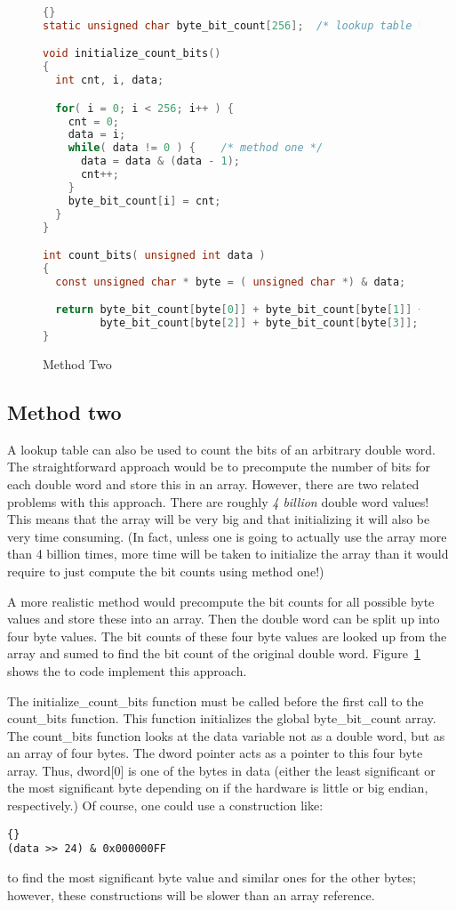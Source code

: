 \begin{figure}[t]
\begin{lstlisting}[frame=tlrb, language=C]{}
static unsigned char byte_bit_count[256];  /* lookup table */

void initialize_count_bits()
{
  int cnt, i, data;

  for( i = 0; i < 256; i++ ) {
    cnt = 0;
    data = i;
    while( data != 0 ) {	/* method one */
      data = data & (data - 1);
      cnt++;
    }
    byte_bit_count[i] = cnt;
  }
}

int count_bits( unsigned int data )
{
  const unsigned char * byte = ( unsigned char *) & data;

  return byte_bit_count[byte[0]] + byte_bit_count[byte[1]] +
         byte_bit_count[byte[2]] + byte_bit_count[byte[3]];
}
\end{lstlisting}
\caption{Method Two \label{fig:meth2}}
\end{figure}

\subsection{Method two}

A lookup table can also be used to count the bits of an arbitrary double
word. The straightforward approach would be to precompute the number of bits
for each double word and store this in an array. However, there are two
related problems with this approach. There are roughly \emph{4 billion}
double word values! This means that the array will be very big and that
initializing it will also be very time consuming. (In fact, unless one is 
going to actually use the array more than 4 billion times, more time will
be taken to initialize the array than it would require to just compute the
bit counts using method one!)

A more realistic method would precompute the bit counts for all possible
byte values and store these into an array. Then the double word can be
split up into four byte values. The bit counts of these four byte values
are looked up from the array and sumed to find the bit count of the 
original double word. Figure~\ref{fig:meth2} shows the to code implement
this approach.

The {\code initialize\_count\_bits} function must be called before the
first call to the {\code count\_bits} function. This function initializes
the global {\code byte\_bit\_count} array. The {\code count\_bits} function
looks at the {\code data} variable not as a double word, but as an array
of four bytes. The {\code dword} pointer acts as a pointer to this
four byte array. Thus, {\code dword[0]} is one of the bytes in {\code
data} (either the least significant or the most significant byte depending 
on if the hardware is little or big endian, respectively.) Of course, one
could use a construction like:
\begin{lstlisting}[stepnumber=0]{}
(data >> 24) & 0x000000FF
\end{lstlisting}
\noindent to find the most significant byte value and similar ones for the 
other bytes; however, these constructions will be slower than an array
reference.

